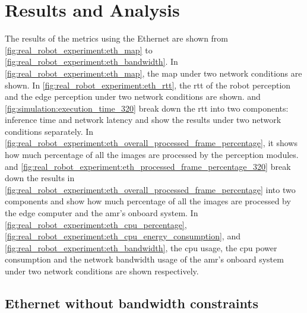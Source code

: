 
\section{Results and Analysis}\label{sec:real_robot_experiment:results_and_discussion}

The results of the metrics using the Ethernet are shown from \cref{fig:real_robot_experiment:eth_map} to \cref{fig:real_robot_experiment:eth_bandwidth}. In \cref{fig:real_robot_experiment:eth_map}, the \gls{map} under two network conditions are shown. In \cref{fig:real_robot_experiment:eth_rtt}, the \gls{rtt} of the robot perception and the edge perception under two network conditions are shown.  and \cref{fig:simulation:execution_time_320} break down the \gls{rtt} into two components: inference time and network latency and show the results under two network conditions separately. In \cref{fig:real_robot_experiment:eth_overall_processed_frame_percentage}, it shows how much percentage of all the images are processed by the perception modules.  and \cref{fig:real_robot_experiment:eth_processed_frame_percentage_320} break down the results in \cref{fig:real_robot_experiment:eth_overall_processed_frame_percentage} into two components and show how much percentage of all the images are processed by the edge computer and the \gls{amr}'s onboard system. In \cref{fig:real_robot_experiment:eth_cpu_percentage}, \cref{fig:real_robot_experiment:eth_cpu_energy_consumption}, and \cref{fig:real_robot_experiment:eth_bandwidth}, the \gls{cpu} usage, the \gls{cpu} power consumption and the network bandwidth usage of the \gls{amr}'s onboard system under two network conditions are shown respectively. 

\subsection{Ethernet without bandwidth constraints}

